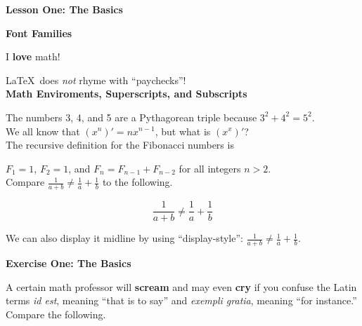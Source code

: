 \documentclass{amsart}
\begin{document}
\begin{center}
	\textbf{Lesson One: The Basics}
\end{center}

\textbf{Font Families}

I \textbf{love} math!

\LaTeX\ does \emph{not} rhyme with ``paychecks''!\\

\textbf{Math Enviroments, Superscripts, and Subscripts}

The numbers 3, 4, and 5 are a Pythagorean triple because $3^2+4^2=5^2$.\\

We all     know      that $(x^n)'=nx^{n-1}$, but what is $(x^x)'$?\\ 

The recursive definition for the Fibonacci numbers is

$F_1=1$, $F_2=1$, and $F_n=F_{n-1}+F_{n-2}$ for all integers $n>2$.\\

Compare $\frac{1}{a+b}\neq\frac{1}{a}+\frac{1}{b}$ to the following.

$$\frac{1}{a+b}\neq\frac{1}{a}+\frac{1}{b}$$

We can also display it midline by using ``display-style'': 
$\displaystyle\frac{1}{a+b}\neq\frac{1}{a}+\frac{1}{b}$.\\



\begin{center}
  \textbf{Exercise One: The Basics}
\end{center}

A certain math professor will \textbf{scream} and may even \textbf{cry} if you
confuse the Latin terms \emph{id est}, meaning ``that is to say'' and
\emph{exempli gratia}, meaning ``for instance.''
Compare the following.\\
\end{document}

